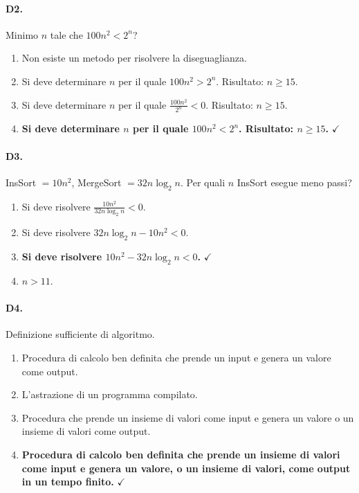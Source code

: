\paragraph{D2.} Minimo $n$ tale che $100n^2 < 2^n$?
\begin{enumerate}[label=\Alph*.,leftmargin=*]
	\item Non esiste un metodo per risolvere la diseguaglianza.
	\item Si deve determinare $n$ per il quale $100n^2 > 2^n$. Risultato: $n \ge 15$.
	\item Si deve determinare $n$ per il quale $\frac{100n^2}{2^n} < 0$. Risultato: $n \ge 15$.
	\item \textcolor{correctgreen}{\textbf{Si deve determinare $n$ per il quale $100n^2 < 2^n$. Risultato: $n \ge 15$.}} \hfill\textcolor{correctgreen}{$\checkmark$}
\end{enumerate}

\paragraph{D3.} InsSort $= 10n^2$, MergeSort $= 32n\log_2 n$. Per quali $n$ InsSort esegue meno passi?
\begin{enumerate}[label=\Alph*.,leftmargin=*]
	\item Si deve risolvere $\frac{10n^2}{32n\log_2 n} < 0$.
	\item Si deve risolvere $32n\log_2 n - 10n^2 < 0$.
	\item \textcolor{correctgreen}{\textbf{Si deve risolvere $10n^2 - 32n\log_2 n < 0$.}} \hfill\textcolor{correctgreen}{$\checkmark$}
	\item $n > 11$.
\end{enumerate}

\paragraph{D4.} Definizione sufficiente di algoritmo.
\begin{enumerate}[label=\Alph*.,leftmargin=*]
	\item Procedura di calcolo ben definita che prende un input e genera un valore come output.
	\item L'astrazione di un programma compilato.
	\item Procedura che prende un insieme di valori come input e genera un valore o un insieme di valori come output.
	\item \textcolor{correctgreen}{\textbf{Procedura di calcolo ben definita che prende un insieme di valori come input e genera un valore, o un insieme di valori, come output in un tempo finito.}} \hfill\textcolor{correctgreen}{$\checkmark$}
\end{enumerate}

